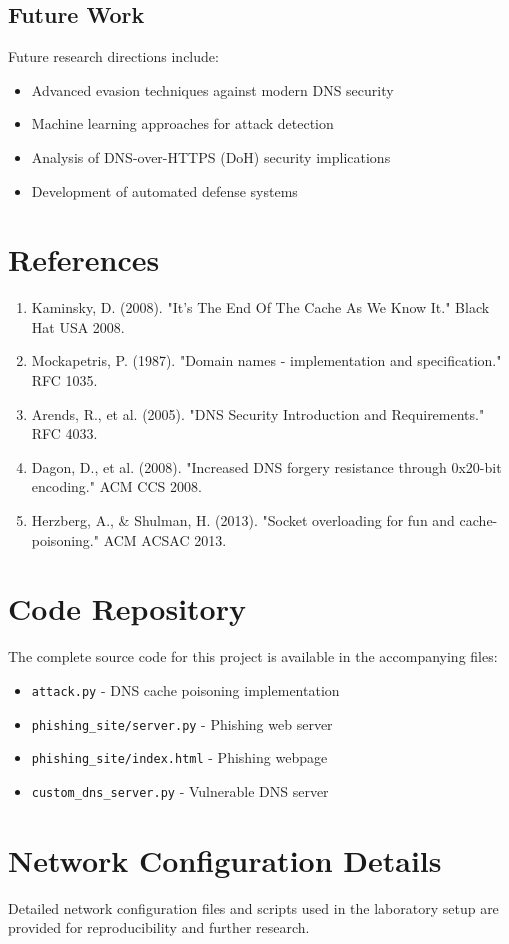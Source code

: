 \documentclass[12pt,a4paper]{article}
\begin{document}
\subsection{Future Work}

Future research directions include:
\begin{itemize}
    \item Advanced evasion techniques against modern DNS security
    \item Machine learning approaches for attack detection
    \item Analysis of DNS-over-HTTPS (DoH) security implications
    \item Development of automated defense systems
\end{itemize}

\section{References}

\begin{enumerate}
    \item Kaminsky, D. (2008). "It's The End Of The Cache As We Know It." Black Hat USA 2008.
    \item Mockapetris, P. (1987). "Domain names - implementation and specification." RFC 1035.
    \item Arends, R., et al. (2005). "DNS Security Introduction and Requirements." RFC 4033.
    \item Dagon, D., et al. (2008). "Increased DNS forgery resistance through 0x20-bit encoding." ACM CCS 2008.
    \item Herzberg, A., \& Shulman, H. (2013). "Socket overloading for fun and cache-poisoning." ACM ACSAC 2013.
\end{enumerate}

\appendix

\section{Code Repository}

The complete source code for this project is available in the accompanying files:

\begin{itemize}
    \item \texttt{attack.py} - DNS cache poisoning implementation
    \item \texttt{phishing\_site/server.py} - Phishing web server
    \item \texttt{phishing\_site/index.html} - Phishing webpage
    \item \texttt{custom\_dns\_server.py} - Vulnerable DNS server
\end{itemize}

\section{Network Configuration Details}

Detailed network configuration files and scripts used in the laboratory setup are provided for reproducibility and further research.
\end{document}
